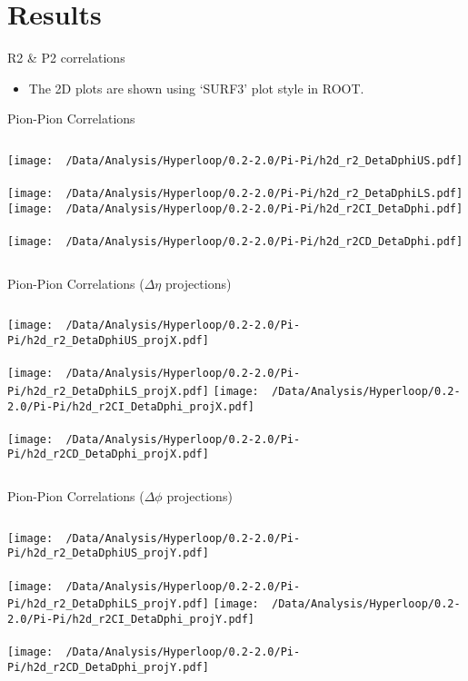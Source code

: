 \documentclass{beamer}
\begin{document}
\section{Results}
\begin{frame}{R2 \& P2 correlations}
	\begin{itemize}
		\item The 2D plots are shown using `SURF3' plot style in ROOT.
	\end{itemize}
\end{frame}
\begin{frame}{Pion-Pion Correlations}
	\begin{columns}
		\centering
		\texttt{[image: ~/Data/Analysis/Hyperloop/0.2-2.0/Pi-Pi/h2d\_r2\_DetaDphiUS.pdf]}\\~\\
		\texttt{[image: ~/Data/Analysis/Hyperloop/0.2-2.0/Pi-Pi/h2d\_r2\_DetaDphiLS.pdf]}
		\centering
		\texttt{[image: ~/Data/Analysis/Hyperloop/0.2-2.0/Pi-Pi/h2d\_r2CI\_DetaDphi.pdf]}\\~\\
		\texttt{[image: ~/Data/Analysis/Hyperloop/0.2-2.0/Pi-Pi/h2d\_r2CD\_DetaDphi.pdf]}
	\end{columns}
\end{frame}
\begin{frame}{Pion-Pion Correlations ($\Delta\eta$ projections)}
	\begin{columns}
		\column{0.5\linewidth}
		\centering
		\texttt{[image: ~/Data/Analysis/Hyperloop/0.2-2.0/Pi-Pi/h2d\_r2\_DetaDphiUS\_projX.pdf]}\\~\\
		\texttt{[image: ~/Data/Analysis/Hyperloop/0.2-2.0/Pi-Pi/h2d\_r2\_DetaDphiLS\_projX.pdf]}
		\column{0.5\linewidth}
		\centering
		\texttt{[image: ~/Data/Analysis/Hyperloop/0.2-2.0/Pi-Pi/h2d\_r2CI\_DetaDphi\_projX.pdf]}\\~\\
		\texttt{[image: ~/Data/Analysis/Hyperloop/0.2-2.0/Pi-Pi/h2d\_r2CD\_DetaDphi\_projX.pdf]}
	\end{columns}
\end{frame}
\begin{frame}{Pion-Pion Correlations ($\Delta\phi$ projections)}
	\begin{columns}
		\centering
		\texttt{[image: ~/Data/Analysis/Hyperloop/0.2-2.0/Pi-Pi/h2d\_r2\_DetaDphiUS\_projY.pdf]}\\~\\
		\texttt{[image: ~/Data/Analysis/Hyperloop/0.2-2.0/Pi-Pi/h2d\_r2\_DetaDphiLS\_projY.pdf]}
		\centering
		\texttt{[image: ~/Data/Analysis/Hyperloop/0.2-2.0/Pi-Pi/h2d\_r2CI\_DetaDphi\_projY.pdf]}\\~\\
		\texttt{[image: ~/Data/Analysis/Hyperloop/0.2-2.0/Pi-Pi/h2d\_r2CD\_DetaDphi\_projY.pdf]}
	\end{columns}
\end{frame}
\end{document}
